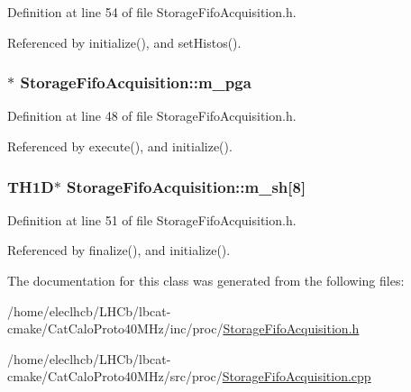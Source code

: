 Definition at line 54 of file StorageFifoAcquisition.h.

Referenced by initialize(), and setHistos().\hypertarget{classStorageFifoAcquisition_a30a158fb750e33fbec4f2f9ee8cbb68f}{
\subsubsection[{m\_\-pga}]{$\ast$ {\bf StorageFifoAcquisition::m\_\-pga}}}
\label{classStorageFifoAcquisition_a30a158fb750e33fbec4f2f9ee8cbb68f}


Definition at line 48 of file StorageFifoAcquisition.h.

Referenced by execute(), and initialize().\hypertarget{classStorageFifoAcquisition_ace3efa07a424f66783388ad073b31830}{
\subsubsection[{m\_\-sh}]{\setlength{\rightskip}{0pt plus 5cm}TH1D$\ast$ {\bf StorageFifoAcquisition::m\_\-sh}\mbox{[}8\mbox{]}}}
\label{classStorageFifoAcquisition_ace3efa07a424f66783388ad073b31830}


Definition at line 51 of file StorageFifoAcquisition.h.

Referenced by finalize(), and initialize().

The documentation for this class was generated from the following files:\begin{DoxyCompactItemize}
\item 
/home/eleclhcb/LHCb/lbcat-\/cmake/CatCaloProto40MHz/inc/proc/\hyperlink{StorageFifoAcquisition_8h}{StorageFifoAcquisition.h}\item 
/home/eleclhcb/LHCb/lbcat-\/cmake/CatCaloProto40MHz/src/proc/\hyperlink{StorageFifoAcquisition_8cpp}{StorageFifoAcquisition.cpp}\end{DoxyCompactItemize}
